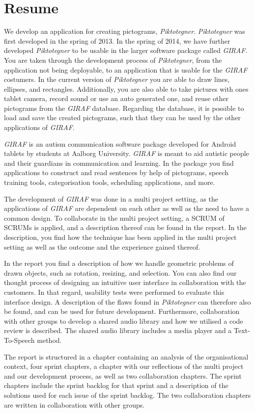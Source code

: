 \chapter{Resume}
We develop an application for creating pictograms, \textit{Piktotegner}.
\textit{Piktotegner} was first developed in the spring of 2013.
In the spring of 2014, we have further developed \textit{Piktotegner} to be usable in the larger software package called \textit{GIRAF}.
You are taken through the development process of \textit{Piktotegner}, from the application not being deployable, to an application that is usable for the \textit{GIRAF} costumers.
In the current version of \textit{Piktotegner} you are able to draw lines, ellipses, and rectangles.
Additionally, you are also able to take pictures with ones tablet camera, record sound or use an auto generated one, and reuse other pictograms from the \textit{GIRAF} database.
Regarding the database, it is possible to load and save the created pictograms, such that they can be used by the other applications of \textit{GIRAF}.

\textit{GIRAF} is an autism communication software package developed for Android tablets by students at Aalborg University.
\textit{GIRAF} is meant to aid autistic people and their guardians in communication and learning. 
In the package you find applications to construct and read sentences by help of pictograms, speech training tools, categorisation tools, scheduling applications, and more.

The development of \textit{GIRAF} was done in a multi project setting, as the applications of \textit{GIRAF} are dependent on each other as well as the need to have a common design. 
To collaborate in the multi project setting, a SCRUM of SCRUMs is applied, and a description thereof can be found in the report.
In the description, you find how the technique has been applied in the multi project setting as well as the outcome and the experience gained thereof.

In the report you find a description of how we handle geometric problems of drawn objects, such as rotation, resizing, and selection.
You can also find our thought process of designing an intuitive user interface in collaboration with the customers.
In that regard, usability tests were performed to evaluate this interface design.
A description of the flaws found in \textit{Piktotegner} can therefore also be found, and can be used for future development.
Furthermore, collaboration with other groups to develop a shared audio library and how we utilised a code review is described.
The shared audio library includes a media player and a Text-To-Speech method.

The report is structured in a chapter containing an analysis of the organisational context, four sprint chapters, a chapter with our reflections of the multi project and our development process, as well as two collaboration chapters.
The sprint chapters include the sprint backlog for that sprint and a description of the solutions used for each issue of the sprint backlog.
The two collaboration chapters are written in collaboration with other groups.